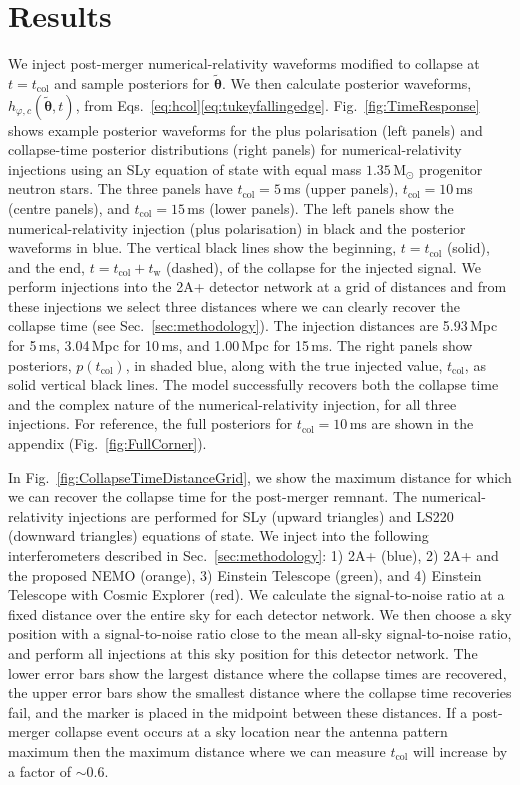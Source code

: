 \documentclass[
reprint,
prd,
twocolumn,
nofootinbib,
tightenlines %
floatfix,
 amsmath,
showpacs ,amssymb, aps,%
superscriptaddress
]{revtex4-1}
\newcommand{\tc}{t_{\mathrm{col}}}
\newcommand{\tw}{t_{\mathrm{w}}}
\begin{document}
\section{Results}\label{sec:results}
    We inject post-merger numerical-relativity waveforms modified to collapse at $t=\tc$ and sample posteriors for $\boldsymbol{\tilde{\theta}}$.
    We then calculate posterior waveforms, $h_{\varphi,c}(\boldsymbol{\tilde{\theta}},t)$, from Eqs.~\ref{eq:hcol}\Hyphdash*\ref{eq:tukeyfallingedge}.
    Fig.~\ref{fig:TimeResponse} shows example posterior waveforms for the plus polarisation (left panels) and collapse-time posterior distributions (right panels) for numerical-relativity injections using an SLy equation of state with equal mass $1.35\,\mathrm{M}_\odot$ progenitor neutron stars.
    The three panels have $\tc=5$\,ms (upper panels), $\tc=10$\,ms (centre panels), and $\tc=15$\,ms (lower panels).
    The left panels show the numerical-relativity injection (plus polarisation) in black and the posterior waveforms in blue.
    The vertical black lines show the beginning, $t=\tc$ (solid), and the end, $t=\tc+\tw$ (dashed), of the collapse for the injected signal.
    We perform injections into the 2A+ detector network at a grid of distances  and from these injections we select three distances where we can clearly recover the collapse time (see Sec.~\ref{sec:methodology}).
    The injection distances are 5.93\,Mpc for 5\,ms, 3.04\,Mpc for 10\,ms, and 1.00\,Mpc for 15\,ms.
    The right panels show posteriors, $p(\tc)$, in shaded blue, along with the true injected value, $\tc$, as solid vertical black lines.
    The model successfully recovers both the collapse time and the complex nature of the numerical-relativity injection, for all three injections.
    For reference, the full posteriors for $\tc=10\,$ms are shown in the appendix (Fig.~\ref{fig:FullCorner}).\par

\par
    In Fig.~\ref{fig:CollapseTimeDistanceGrid}, we show the maximum distance for which we can recover the collapse time for the post-merger remnant.
    The numerical-relativity injections are performed for SLy (upward triangles) and LS220 (downward triangles) equations of state.
    We inject into the following interferometers described in Sec.~\ref{sec:methodology}: 1) 2A+ (blue), 2) 2A+ and the proposed NEMO (orange), 3) Einstein Telescope (green), and 4) Einstein Telescope with Cosmic Explorer (red).
    We calculate the signal-to-noise ratio at a fixed distance over the entire sky for each detector network.
    We then choose a sky position with a signal-to-noise ratio close to the mean all-sky signal-to-noise ratio, and perform all injections at this sky position for this detector network.
    The lower error bars show the largest distance where the collapse times are recovered, the upper error bars show the smallest distance where the collapse time recoveries fail, and the marker is placed in the midpoint between these distances.
    If a post-merger collapse event occurs at a sky location near the antenna pattern maximum then the maximum distance where we can measure $\tc$ will increase by a factor of $\sim\!0.6$.
    \par
    
\end{document}
